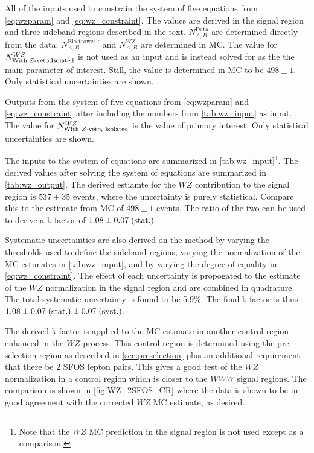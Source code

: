 \begin{table}
\centering

\caption{All of the inputs used to constrain the system of five equations
from \eqn\eqref{eq:wzparam} and \eqn\eqref{eq:wz_constraint}.
The values are derived in the signal region and three sideband regions
described in the text. $N^{\textrm{Data}}_{A,B}$ are determined directly
from the data; $N^{\textrm{Electroweak}}_{A,B}$ and $N^{WZ}_{A,B}$ are 
determined in MC. The value for $N^{WZ}_{\textrm{With \z-veto,Isolated}}$ is
not used as an input and is instead solved for as the the main
parameter of interest. Still, the value is determined in MC to be
$498 \pm 1$.  Only statistical uncertainties are shown.}
\label{tab:wz_input}
\end{table}

\begin{table}
\centering

\caption{Outputs from the system of five equations
from \eqn\eqref{eq:wzparam} and \eqn\eqref{eq:wz_constraint}
after including the numbers from \tab\ref{tab:wz_input} as input.
The value for $N^{WZ}_{\textrm{With \z-veto, Isolated}}$ is 
the value of primary interest.  Only statistical uncertainties are shown.}
\label{tab:wz_output}
\end{table}


The inputs to the system of equations are summarized in 
\tab\ref{tab:wz_input}\footnote{Note that the $WZ$ MC prediction in 
the signal region is not used except as a comparison.}.
The derived values after solving the system of equations are
summarized in \tab\ref{tab:wz_output}. 
The derived estiamte for the $WZ$ contribution to 
the signal region is 
$537 \pm 35$
events, where the uncertainty is purely statistical. 
Compare this to the estimate from MC of 
$498 \pm 1$ events.
The ratio of the two can be used to derive a k-factor of
$1.08\pm0.07\mbox{$\;$(stat.)}$.


Systematic uncertainties are also derived on the method
by varying the 
thresholds used to define the sideband regions, varying the normalization
of the MC estimates in \tab\ref{tab:wz_input}, and by varying the degree
of equality in \eqn\eqref{eq:wz_constraint}. The effect of each
uncertainty is propogated to the estimate of the $WZ$ normalization in
the signal region and are combined in quadrature. The total systematic
uncertainty is found to be 5.9\%. 
The final k-factor is thus $1.08 \pm0.07\mbox{$\;$(stat.)}\pm0.07\mbox{$\;$(syst.)}$.

The derived k-factor is applied to the MC estimate in another control
region enhanced in the $WZ$ process. This control region is determined
using the pre-selection region as described in \sec\ref{sec:preselection}
plus an additional requirement that there be 2 SFOS lepton pairs.
This gives a good test of the $WZ$ normalization in a control region
which is closer to the $WWW$ signal regions. 
The comparison is shown in \fig\ref{fig:WZ_2SFOS_CR} where
the data is shown to be in good agreement with the corrected $WZ$ MC
estimate, as desired.

